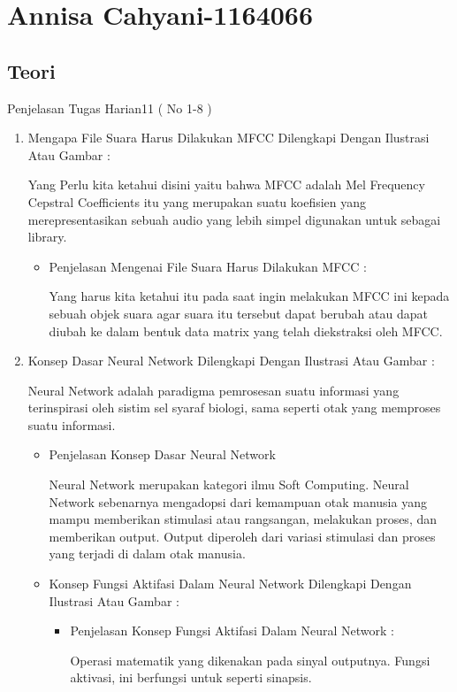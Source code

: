 \section{Annisa Cahyani-1164066}
\subsection{Teori}
Penjelasan Tugas Harian11 ( No 1-8 )
\begin{enumerate}
\item Mengapa File Suara Harus Dilakukan MFCC Dilengkapi Dengan Ilustrasi Atau Gambar :
\par Yang Perlu kita ketahui disini yaitu  bahwa MFCC adalah Mel Frequency Cepstral Coefficients itu yang merupakan suatu koefisien yang merepresentasikan sebuah audio yang lebih simpel digunakan untuk sebagai library. 
\begin{itemize}
\item Penjelasan Mengenai  File Suara Harus Dilakukan MFCC : 
\par Yang harus kita ketahui itu pada saat ingin melakukan MFCC ini kepada sebuah objek suara agar suara itu tersebut dapat berubah atau dapat diubah ke dalam bentuk data matrix yang telah diekstraksi oleh MFCC.
\end{itemize}
\par
\par
\item Konsep Dasar Neural Network Dilengkapi Dengan Ilustrasi Atau Gambar :
\par Neural Network adalah paradigma pemrosesan suatu informasi yang terinspirasi oleh sistim sel syaraf biologi, sama seperti otak yang memproses suatu informasi. 
\begin{itemize}
\item Penjelasan Konsep Dasar Neural Network
\par Neural Network merupakan kategori ilmu Soft Computing. Neural Network sebenarnya mengadopsi dari kemampuan otak manusia yang mampu memberikan stimulasi atau rangsangan, melakukan proses, dan memberikan output. Output diperoleh dari variasi stimulasi dan proses yang terjadi di dalam otak manusia.
\par
\par
\item Konsep Fungsi Aktifasi Dalam Neural Network Dilengkapi Dengan Ilustrasi Atau Gambar :
\begin{itemize}
\item Penjelasan Konsep Fungsi Aktifasi Dalam Neural Network :
\par Operasi matematik yang dikenakan pada sinyal outputnya. Fungsi aktivasi, ini berfungsi untuk seperti sinapsis. 

\end{itemize}
\end{itemize}
\end{enumerate}
